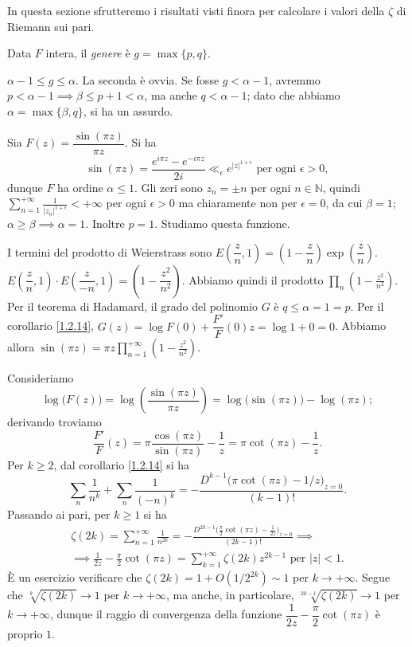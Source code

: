 In questa sezione sfrutteremo i risultati visti finora per calcolare i valori della $\zeta$ di Riemann sui pari.

\begin{defn}
  Data $F$ intera, il \textit{genere} è $g=\max\{p,q\}$.
\end{defn}

\begin{oss}
  $\alpha-1 \le g \le \alpha$. La seconda è ovvia. Se fosse $g<\alpha-1$, avremmo $p<\alpha-1 \implies \beta \le p+1<\alpha$, ma anche $q<\alpha-1$; dato che abbiamo $\alpha=\max\{\beta,q\}$, si ha un assurdo.
\end{oss}

\begin{ex}
  Sia $F(z)=\dfrac{\sin(\pi z)}{\pi z}$. Si ha
  $$\sin(\pi z)=\frac{e^{i\pi z}-e^{-i\pi z}}{2i} \ll_{\epsilon} e^{|z|^{1+\epsilon}} \text{ per ogni } \epsilon>0,$$
  dunque $F$ ha ordine $\alpha \le 1$. Gli zeri sono $z_n=\pm n$ per ogni $n \in \mathbb{N}$, quindi $\displaystyle \sum_{n=1}^{+\infty} \frac{1}{|z_n|^{1+\epsilon}}<+\infty$ per ogni $\epsilon>0$ ma chiaramente non per $\epsilon=0$, da cui $\beta=1$;
  $\alpha \ge \beta \implies \alpha=1$. Inoltre $p=1$. Studiamo questa funzione.
\end{ex}

I termini del prodotto di Weierstrass sono $E\left(\dfrac{z}{n},1\right)=\left(1-\dfrac{z}{n}\right)\exp\left(\dfrac{z}{n}\right)$. $E\left(\dfrac{z}{n},1\right) \cdot E\left(\dfrac{z}{-n},1\right)=\left(1-\dfrac{z^2}{n^2}\right)$.
Abbiamo quindi il prodotto $\displaystyle \prod_n \left(1-\frac{z^2}{n^2}\right)$. Per il teorema di Hadamard, il grado del polinomio $G$ è $q \le \alpha=1=p$. Per il corollario \ref{1.2.14}, $G(z)=\log{F(0)}+\dfrac{F'}{F}(0)z=\log{1}+0=0$.
Abbiamo allora $\displaystyle \sin(\pi z)=\pi z\prod_{n=1}^{+\infty} \left(1-\frac{z^2}{n^2}\right)$.

Consideriamo
$$\log\big(F(z)\big)=\log\left(\frac{\sin(\pi z)}{\pi z}\right)=\log\big(\sin(\pi z)\big)-\log(\pi z);$$
derivando troviamo
$$\frac{F'}{F}(z)=\pi\frac{\cos(\pi z)}{\sin(\pi z)}-\frac{1}{z}=\pi\cot(\pi z)-\frac{1}{z}.$$
Per $k \ge 2$, dal corollario \ref{1.2.14} si ha
$$\sum_n \frac{1}{n^k}+\sum_n \frac{1}{(-n)^k}=-\frac{D^{k-1}\big(\pi\cot(\pi z)-1/z\big)_{z=0}}{(k-1)!}.$$
Passando ai pari, per $k \ge 1$ si ha
\begin{gather*}
  \zeta(2k)=\sum_{n=1}^{+\infty} \frac{1}{n^{2k}}=-\frac{D^{2k-1}\big(\frac{\pi}{2}\cot(\pi z)-\frac{1}{2z}\big)_{z=0}}{(2k-1)!} \implies \\
  \implies \frac{1}{2z}-\frac{\pi}{2}\cot(\pi z)=\sum_{k=1}^{+\infty} \zeta(2k)z^{2k-1} \text{ per } |z|<1.
\end{gather*}
È un esercizio verificare che $\zeta(2k)=1+O(1/2^{2k}) \sim 1$ per $k \longrightarrow +\infty$. Segue che $\sqrt[k]{\zeta(2k)} \longrightarrow 1$ per $k \longrightarrow +\infty$, ma anche, in particolare, $\sqrt[2k-1]{\zeta(2k)} \longrightarrow 1$ per $k \longrightarrow +\infty$, dunque il raggio di convergenza della funzione $\dfrac{1}{2z}-\dfrac{\pi}{2}\cot(\pi z)$ è proprio $1$.

